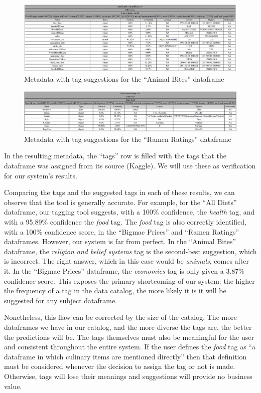 \begin{figure}[H]
    \centering
    \includegraphics[width=12cm]{figures/tag_suggestions/health_animal_bites_tags}
    \caption{Metadata with tag suggestions for the ``Animal Bites'' dataframe}
    \label{fig:animal_bites_tags}
\end{figure}

\begin{figure}[H]
    \centering
    \includegraphics[width=12cm]{figures/tag_suggestions/ramen_ratings_tags}
    \caption{Metadata with tag suggestions for the ``Ramen Ratings'' dataframe}
    \label{fig:ramen_ratings_tags}
\end{figure}

In the resulting metadata, the ``tags'' row is filled with the tags that the dataframe was assigned from its source (Kaggle).
We will use these as verification for our system's results.

Comparing the tags and the suggested tags in each of these results, we can observe that the tool is generally accurate.
For example, for the ``All Diets'' dataframe, our tagging tool suggests, with a 100\% confidence, the \textit{health} tag,
and with a 95.89\% confidence the \textit{food} tag.
The \textit{food} tag is also correctly identified, with a 100\% confidence score, in the ``Bigmac Prices'' and ``Ramen Ratings''
dataframes.
However, our system is far from perfect.
In the ``Animal Bites'' dataframe, the \textit{religion and belief systems} tag is the second-best suggestion, which is incorrect.
The right answer, which in this case would be \textit{animals}, comes after it.
In the ``Bigmac Prices'' dataframe, the \textit{economics} tag is only given a 3.87\% confidence score.
This exposes the primary shortcoming of our system: the higher the frequency of a tag in the data catalog, the more likely
it is it will be suggested for any subject dataframe.

Nonetheless, this flaw can be corrected by the size of the catalog.
The more dataframes we have in our catalog, and the more diverse the tags are, the better the predictions will be.
The tags themselves must also be meaningful for the user and consistent throughout the entire system.
If the user defines the \textit{food} tag as ``a dataframe in which culinary items are mentioned directly'' then that definition
must be considered whenever the decision to assign the tag or not is made.
Otherwise, tags will lose their meanings and suggestions will provide no business value.